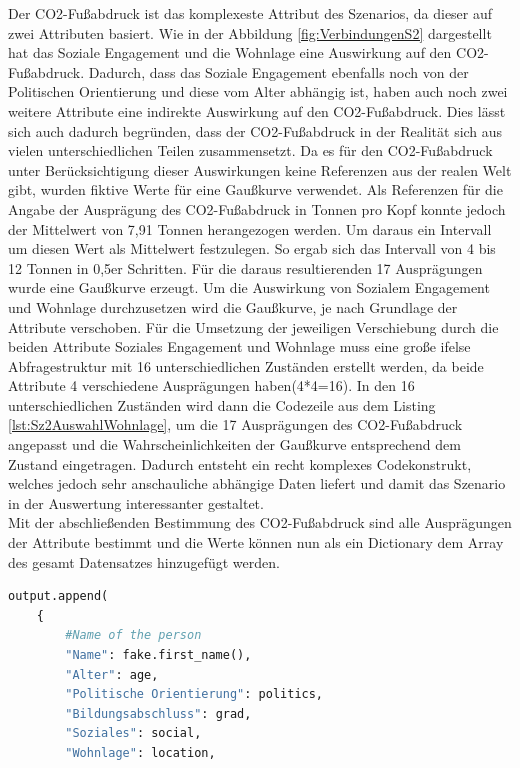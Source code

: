 \begin{onehalfspace}
Der CO2-Fußabdruck ist das komplexeste Attribut des Szenarios, da dieser auf zwei Attributen basiert. Wie in der Abbildung \ref{fig:VerbindungenS2} dargestellt hat das Soziale Engagement und die Wohnlage eine Auswirkung auf den CO2-Fußabdruck. Dadurch, dass das Soziale Engagement ebenfalls noch von der Politischen Orientierung und diese vom Alter abhängig ist, haben auch noch zwei weitere Attribute eine indirekte Auswirkung auf den CO2-Fußabdruck. Dies lässt sich auch dadurch begründen, dass der CO2-Fußabdruck in der Realität sich aus vielen unterschiedlichen Teilen zusammensetzt. Da es für den CO2-Fußabdruck unter Berücksichtigung dieser Auswirkungen keine Referenzen aus der realen Welt gibt, wurden fiktive Werte für eine Gaußkurve verwendet. Als Referenzen für die Angabe der Ausprägung des CO2-Fußabdruck in Tonnen pro Kopf konnte jedoch der Mittelwert von 7,91 Tonnen herangezogen werden.\cite{ClimateWatch2022} Um daraus ein Intervall um diesen Wert als Mittelwert festzulegen. So ergab sich das Intervall von 4 bis 12 Tonnen in 0,5er Schritten. Für die daraus resultierenden 17 Ausprägungen wurde eine Gaußkurve erzeugt. Um die Auswirkung von Sozialem Engagement und Wohnlage durchzusetzen wird die Gaußkurve, je nach Grundlage der Attribute verschoben. Für die Umsetzung der jeweiligen Verschiebung durch die beiden Attribute Soziales Engagement und Wohnlage muss eine große ifelse Abfragestruktur mit 16 unterschiedlichen Zuständen erstellt werden, da beide Attribute 4 verschiedene Ausprägungen haben(4*4=16). In den 16 unterschiedlichen Zuständen wird dann die Codezeile aus dem Listing \ref{lst:Sz2AuswahlWohnlage}, um die 17 Ausprägungen des CO2-Fußabdruck angepasst und die Wahrscheinlichkeiten der Gaußkurve entsprechend dem Zustand eingetragen. Dadurch entsteht ein recht komplexes Codekonstrukt, welches jedoch sehr anschauliche abhängige Daten liefert und damit das Szenario in der Auswertung interessanter gestaltet.\\
Mit der abschließenden Bestimmung des CO2-Fußabdruck sind alle Ausprägungen der Attribute bestimmt und die Werte können nun als ein Dictionary dem Array des gesamt Datensatzes hinzugefügt werden.
\begin{lstlisting}[language=Python,label={lst:Sz2AddEntry},caption=Codeausschnitt zum Hinzufügen eines Dateneintrags zum gesamt Datenset]
output.append(
    {
        #Name of the person
        "Name": fake.first_name(),
        "Alter": age,
        "Politische Orientierung": politics,
        "Bildungsabschluss": grad,
        "Soziales": social,
        "Wohnlage": location,

\end{lstlisting}
\end{onehalfspace}
